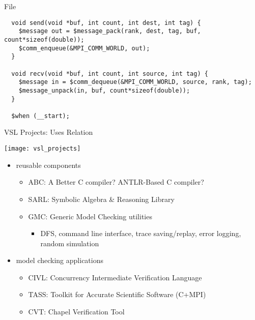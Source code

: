 \documentclass[t]{beamer}
\begin{document}
\begin{frame}[containsverbatim]{File }
  \scriptsize
\begin{verbatim}
  void send(void *buf, int count, int dest, int tag) {
    $message out = $message_pack(rank, dest, tag, buf, count*sizeof(double));
    $comm_enqueue(&MPI_COMM_WORLD, out);
  }

  void recv(void *buf, int count, int source, int tag) {
    $message in = $comm_dequeue(&MPI_COMM_WORLD, source, rank, tag);
    $message_unpack(in, buf, count*sizeof(double));
  }

  $when (__start);
\end{verbatim}
\end{frame}

\begin{frame}{VSL Projects: Uses Relation}

  \texttt{[image: vsl\_projects]}

  \begin{itemize}
  \item reusable components
    \begin{itemize}
    \item ABC: A Better C compiler?  ANTLR-Based C compiler?
    \item SARL: Symbolic Algebra \& Reasoning Library
    \item GMC: Generic Model Checking utilities
      \begin{itemize}
      \item DFS, command line interface, trace saving/replay, error
        logging, random simulation
      \end{itemize}
    \end{itemize}
  \item model checking applications
    \begin{itemize}
    \item CIVL: Concurrency Intermediate Verification Language
    \item TASS: Toolkit for Accurate Scientific Software (C+MPI)
    \item CVT: Chapel Verification Tool
    \end{itemize}
  \end{itemize}

\end{frame}
\end{document}
